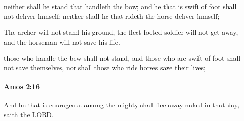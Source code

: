 			\begin{versebox}
					\item[BHS] 
					\item[LXX] 
					\item[ASV] neither shall he stand that handleth the bow; and he that is swift of foot shall not deliver himself; neither shall he that rideth the horse deliver himself;
					\item[NIV] The archer will not stand his ground, the fleet-footed soldier will not get away, and the horseman will not save his life.
					\item[NRSV] those who handle the bow shall not stand, and those who are swift of foot shall not save themselves, nor shall those who ride horses save their lives;
			\end{versebox}

		\paragraph{Amos 2:16} %
			\label{AMOS-2-16}

			And he that is courageous among the mighty shall flee away naked in that day, saith the LORD.

